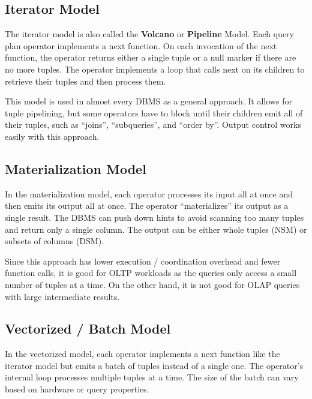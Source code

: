 \documentclass[11pt]{article}
\begin{document}
\subsection*{Iterator Model}
The iterator model is also called the \textbf{Volcano} or \textbf{Pipeline} Model. Each query plan 
operator implements a next function. On each invocation of the next function, the operator returns 
either a single tuple or a null marker if there are no more tuples. The operator implements a loop 
that calls next on its children to retrieve their tuples and then process them.

This model is used in almost every DBMS as a general approach. It allows for tuple pipelining, but 
some operators have to block until their children emit all of their tuples, such as ``joins'', 
``subqueries'', and ``order by''. Output control works easily with this approach.

\subsection*{Materialization Model}
In the materialization model, each operator processes its input all at once and then emits its 
output all at once. The operator ``materializes'' its output as a single result. The DBMS can push 
down hints to avoid scanning too many tuples and return only a single column. The output can be 
either whole tuples (NSM) or subsets of columns (DSM). 

Since this approach has lower execution / coordination overhead and fewer function calls, it is 
good for OLTP workloads as the  queries only access a small number of tuples at a time. On the 
other hand, it is not good for OLAP queries with large intermediate results.

\subsection*{Vectorized / Batch Model}
In the vectorized model, each operator implements a next function like the iterator model but emits 
a batch of tuples instead of a single one. The operator's internal loop processes multiple tuples 
at a time. The size of the batch can vary based on hardware or query properties.
\end{document}
